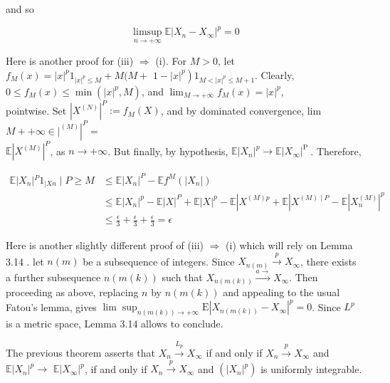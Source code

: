 \documentclass{amsbook}
\theoremstyle{plain}%
\theoremstyle{definition}
\theoremstyle{remark}
\begin{document}
  and so

  $$
  \limsup _{n \rightarrow+\infty} \mathbb{E}\left|X_{n}-X_{\infty}\right|^{p}=0
  $$

  Here is another proof for (iii) $\Rightarrow$ (i). For $M>0$, let $f_{M}(x)=|x|^{p} 1_{|x|^{p} \leq M}+M(M+$ $\left.1-|x|^{p}\right) 1_{M<|x|^{p} \leq M+1}$. Clearly, $0 \leq f_{M}(x) \leq \min \left(|x|^{p}, M\right)$, and $\lim _{M \rightarrow+\infty} f_{M}(x)=|x|^{p}$,\\
  pointwise. Set $\left|X^{(N)}\right|^{P}:=f_{M}(X)$, and by dominated convergence, lim $M++\left.\left.\infty \in\right|^{(M)}\right|^{P}=$\\
  $\mathbb{E}\left|X^{(M)}\right|^{P}$, as $n \rightarrow+\infty$. But finally, by hypothesis, $\mathbb{E}\left|X_{n}\right|^{p} \rightarrow \mathbb{E}\left|X_{\infty}\right|^{\text {P }}$. Therefore,

  $$
  \begin{aligned}
    \mathbb{E}\left|X_{n}\right|{ }^{P} 1_{\mid X n} \mid P \geq M & \leq \mathbb{E}\left|X_{n}\right|^{P}-\mathbb{E} f^{M}\left(\left|X_{n}\right|\right)                                                                                       \\
    & \leq \mathbb{E}\left|X_{n}\right|^{p}-\mathbb{E}|X|^{P}+\mathbb{E}|X|^{p}-\mathbb{E}\left|X^{(M) p}+\mathbb{E}\right| X^{(M) \mid P}-\mathbb{E}\left|X_{n}^{(M)}\right|^{p} \\
    & \leq \frac{\epsilon}{3}+\frac{\epsilon}{3}+\frac{\epsilon}{3}=\epsilon
  \end{aligned}
  $$

  Here is another slightly different proof of (iii) $\Rightarrow$ (i) which will rely on Lemma 3.14 . let $n(m)$ be a subsequence of integers. Since $X_{n(m)} \xrightarrow{p} X_{\infty}$, there exists a further subsequence $n(m(k))$ such that $X_{n(m(k))} \xrightarrow{a \rightarrow} X_{\infty}$. Then proceeding as above, replacing $n$ by $n(m(k))$ and appealing to the usual Fatou's lemma, gives $\lim \sup _{n(m(k)) \rightarrow+\infty} \mathrm{E}\left|X_{n(m(k))}-X_{\infty}\right|^{p}=0$. Since $L^{p}$ is a metric space, Lemma 3.14 allows to conclude.

  The previous theorem asserts that $X_{n} \xrightarrow{L_{p}} X_{\infty}$ if and only if $X_{n} \xrightarrow{p} X_{\infty}$ and $\mathbb{E}\left|X_{n}\right|^{p} \rightarrow$ $\mathbb{E}\left|X_{\infty}\right|^{p}$, if and only if $X_{n} \xrightarrow{p} X_{\infty}$ and $\left(\left|X_{n}\right|^{p}\right)$ is uniformly integrable.
\end{document}

